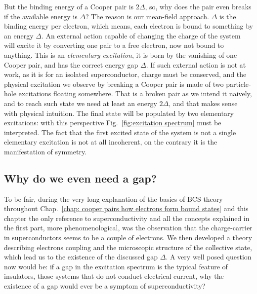 But the binding energy of a Cooper pair is $2\Delta$, so, why does the pair even breaks if the available energy is $\Delta$? The reason is our mean-field approach. $\Delta$ is the binding energy per electron, which means, each electron is bound to something by an energy $\Delta$. An external action capable of changing the charge of the system will excite it by converting one pair to a free electron, now not bound to anything. This is an \textit{elementary excitation}, it is born by the vanishing of one Cooper pair, and has the correct energy gap $\Delta$. If such external action is not at work, as it is for an isolated superconductor, charge must be conserved, and the physical excitation we observe by breaking a Cooper pair is made of two particle-hole excitations floating somewhere. That is a broken pair as we intend it naively, and to reach such state we need at least an energy $2\Delta$, and that makes sense with physical intuition. The final state will be populated by two elementary excitations: with this perspective Fig.~\ref{fig:excitation spectrum} must be interpreted. The fact that the first excited state of the system is not a single elementary excitation is not at all incoherent, on the contrary it is the manifestation of symmetry.

\subsection{Why do we even need a gap?}

To be fair, during the very long explanation of the basics of BCS theory throughout Chap.~\ref{chap: cooper pairs how electrons form bound states} and this chapter the only reference to superconductivity and all the concepts explained in the first part, more phenomenological, was the observation that the charge-carrier in superconductors seems to be a couple of electrons. We then developed a theory describing electrons coupling and the microscopic structure of the collective state, which lead us to the existence of the discussed gap $\Delta$. A very well posed question now would be: if a gap in the excitation spectrum is the typical feature of insulators, those systems that do not conduct electrical current, why the existence of a gap would ever be a symptom of superconductivity? 